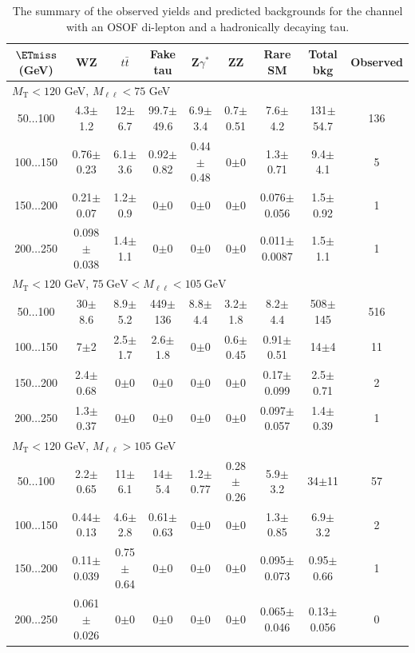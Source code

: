 \begin{landscape}
\begin{table}
\begin{center}
\caption{\label{tab:OSOF1tau1} The summary of the observed yields and predicted backgrounds for the channel with an OSOF di-lepton and a hadronically decaying tau. }
\begin{tabular}{| c | c c c c c c  | c  c | }\hline\hline
$\ETmiss$ (GeV) & WZ & $t\bar{t}$ & Fake tau & Z$\gamma^*$ & ZZ & Rare SM & Total bkg & Observed\\\hline\hline
\multicolumn{7}{l}{$M_{\text{T}} < 120$ GeV, $M_{\ell\ell} < 75$ GeV}\\\hline\hline
50$\dots$100&4.3$\pm$1.2&12$\pm$6.7&99.7$\pm$49.6&6.9$\pm$3.4&0.7$\pm$0.51&7.6$\pm$4.2&131$\pm$54.7&136\\
100$\dots$150&0.76$\pm$0.23&6.1$\pm$3.6&0.92$\pm$0.82&0.44$\pm$0.48&0$\pm$0&1.3$\pm$0.71&9.4$\pm$4.1&5\\
150$\dots$200&0.21$\pm$0.07&1.2$\pm$0.9&0$\pm$0&0$\pm$0&0$\pm$0&0.076$\pm$0.056&1.5$\pm$0.92&1\\
200$\dots$250&0.098$\pm$0.038&1.4$\pm$1.1&0$\pm$0&0$\pm$0&0$\pm$0&0.011$\pm$0.0087&1.5$\pm$1.1&1\\
\hline\hline
\multicolumn{7}{l}{$M_{\text{T}} < 120$ GeV, $75~\mathrm{GeV} < M_{\ell\ell} < 105~\mathrm{GeV}$}\\\hline\hline
50$\dots$100&30$\pm$8.6&8.9$\pm$5.2&449$\pm$136&8.8$\pm$4.4&3.2$\pm$1.8&8.2$\pm$4.4&508$\pm$145&516\\
100$\dots$150&7$\pm$2&2.5$\pm$1.7&2.6$\pm$1.8&0$\pm$0&0.6$\pm$0.45&0.91$\pm$0.51&14$\pm$4&11\\
150$\dots$200&2.4$\pm$0.68&0$\pm$0&0$\pm$0&0$\pm$0&0$\pm$0&0.17$\pm$0.099&2.5$\pm$0.71&2\\
200$\dots$250&1.3$\pm$0.37&0$\pm$0&0$\pm$0&0$\pm$0&0$\pm$0&0.097$\pm$0.057&1.4$\pm$0.39&1\\
\hline\hline
\multicolumn{7}{l}{$M_{\text{T}} < 120$ GeV, $M_{\ell\ell} > 105$ GeV}\\\hline\hline
50$\dots$100&2.2$\pm$0.65&11$\pm$6.1&14$\pm$5.4&1.2$\pm$0.77&0.28$\pm$0.26&5.9$\pm$3.2&34$\pm$11&57\\
100$\dots$150&0.44$\pm$0.13&4.6$\pm$2.8&0.61$\pm$0.63&0$\pm$0&0$\pm$0&1.3$\pm$0.85&6.9$\pm$3.2&2\\
150$\dots$200&0.11$\pm$0.039&0.75$\pm$0.64&0$\pm$0&0$\pm$0&0$\pm$0&0.095$\pm$0.073&0.95$\pm$0.66&1\\
200$\dots$250&0.061$\pm$0.026&0$\pm$0&0$\pm$0&0$\pm$0&0$\pm$0&0.065$\pm$0.046&0.13$\pm$0.056&0\\

\end{tabular}
\end{center}
\end{table}
\end{landscape}
